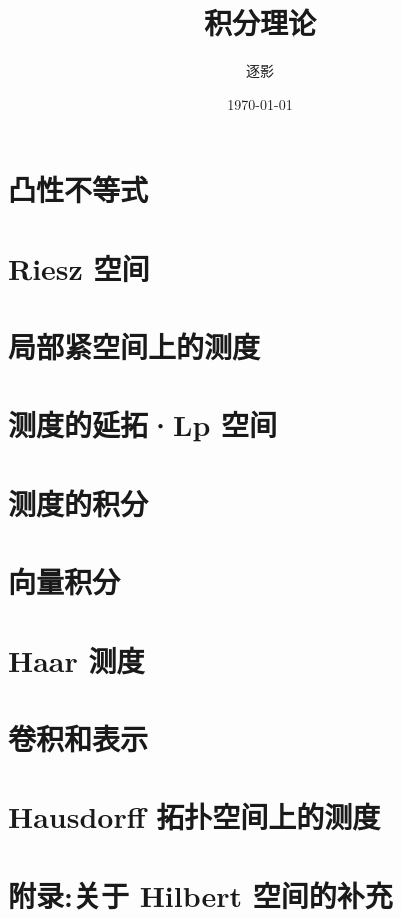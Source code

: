 \documentclass[UTF8,10pt, a4paper, oneside,scheme=plain]{ctexbook}
\author{逐影}
\title{\Huge\textbf{积分理论}}
\date{\today}
\begin{document}
\frontmatter
\maketitle
\tableofcontents
\mainmatter

\part{凸性不等式}


\part{Riesz 空间}


\part{局部紧空间上的测度}


\part{测度的延拓·Lp 空间}


\part{测度的积分}


\part{向量积分}


\part{Haar 测度}


\part{卷积和表示}


\part{Hausdorff 拓扑空间上的测度}


\part{附录:关于 Hilbert 空间的补充}


\backmatter
\end{document}
